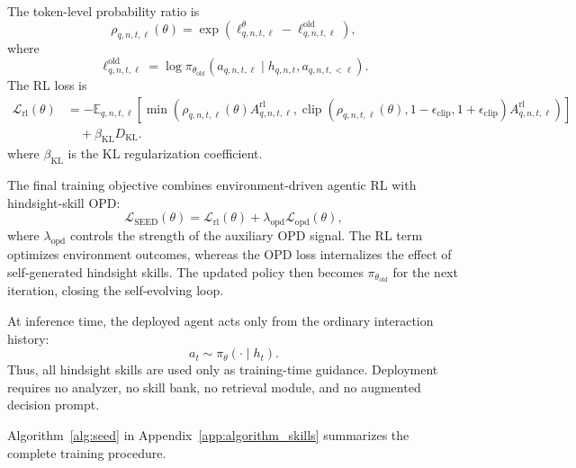 The token-level probability ratio is
\[
\rho_{q,n,t,\ell}(\theta)
=
\exp
\left(
\ell^\theta_{q,n,t,\ell}
-
\ell^{\mathrm{old}}_{q,n,t,\ell}
\right),
\]
where
\[
\ell^{\mathrm{old}}_{q,n,t,\ell}
=
\log
\pi_{\theta_{\mathrm{old}}}
\left(
a_{q,n,t,\ell}
\mid
h_{q,n,t},
a_{q,n,t,<\ell}
\right).
\]
The RL loss is
\[
\begin{aligned}
\mathcal{L}_{\mathrm{rl}}(\theta)
&=
-
\mathbb{E}_{q,n,t,\ell}
\left[
\min
\left(
\rho_{q,n,t,\ell}(\theta)
A^{\mathrm{rl}}_{q,n,t,\ell},
\operatorname{clip}
\left(
\rho_{q,n,t,\ell}(\theta),
1-\epsilon_{\mathrm{clip}},
1+\epsilon_{\mathrm{clip}}
\right)
A^{\mathrm{rl}}_{q,n,t,\ell}
\right)
\right]
\\
&\quad
+
\beta_{\mathrm{KL}}
D_{\mathrm{KL}} .
\end{aligned}
\label{eq:rl_objective}
\]
where $\beta_{\mathrm{KL}}$ is the KL regularization coefficient.

The final training objective combines environment-driven agentic RL with hindsight-skill OPD:
\[
\mathcal{L}_{\mathrm{SEED}}(\theta)
=
\mathcal{L}_{\mathrm{rl}}(\theta)
+
\lambda_{\mathrm{opd}}
\mathcal{L}_{\mathrm{opd}}(\theta),
\]
where $\lambda_{\mathrm{opd}}$ controls the strength of the auxiliary OPD signal. The RL term optimizes environment outcomes, whereas the OPD loss internalizes the effect of self-generated hindsight skills. The updated policy then becomes $\pi_{\theta_{\mathrm{old}}}$ for the next iteration, closing the self-evolving loop.

At inference time, the deployed agent acts only from the ordinary interaction history:
\[
a_t
\sim
\pi_\theta
\left(
\cdot
\mid
h_t
\right).
\]
Thus, all hindsight skills are used only as training-time guidance. Deployment requires no analyzer, no skill bank, no retrieval module, and no augmented decision prompt.

Algorithm~\ref{alg:seed} in Appendix~\ref{app:algorithm_skills} summarizes the complete training procedure.
